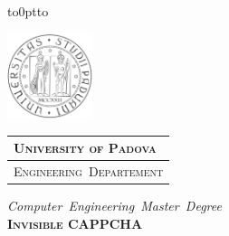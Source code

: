 \documentclass[a4paper, 12pt, twoside, openright]{book}
\begin{document}
\frontmatter

\begin{titlepage} %
\begin{center}
\vbox to0pt{\vbox to\vss}

\begin{minipage}{.20\textwidth}
  \includegraphics[height=2.5cm]{./Images/unipd-bn}
\end{minipage}\begin{minipage}{.90\textwidth}
  \begin{table}[H]
  \begin{tabular}{l}
  \scshape{\Large{\bfseries{University of Padova}}} \\
  \hline
  \scshape{\Large{Engineering~Departement}} \\
  \end{tabular}
  \end{table}
\end{minipage}

\vspace{1cm}
\emph{\Large{Computer~Engineering~Master~Degree}} \\
\vspace{1.5cm}
\scshape{\Large{\bfseries{Invisible CAPPCHA}}} \\
\vspace{0.2cm} \linespread{1} \scshape{\large{\bfseries{}}}
\end{center}


\end{titlepage}
\end{document}
